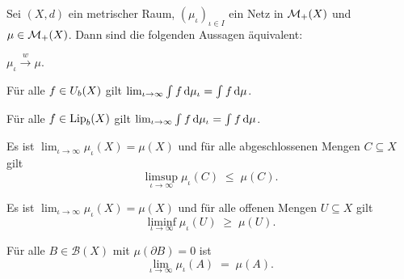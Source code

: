 \documentclass[../main/main.tex]{subfiles}
\begin{document}
	\begin{Satz}[Portmanteau]
		\label{thm:portmanteau}
		Sei $(X, d)$ ein metrischer Raum, $(\mu_\iota)_{\iota \in I}$ ein Netz in $\mathcal{M}_{+}(X)$
		und $\mu \in \mathcal{M}_{+}(X)$. Dann sind die folgenden Aussagen äquivalent:
		\begin{equivalentthm}
			\item $\mu_\iota \xrightarrow{w} \mu$.
			\item Für alle $f \in U_b(X)$ gilt $\lim_{\iota \to \infty} \int_{} \, f \, \mathrm{d}\mu_\iota = \int_{} \, f \, \mathrm{d}\mu$.
			\item Für alle $f \in \mathrm{Lip}_b(X)$ gilt $\lim_{\iota \to \infty} \int_{} \, f \, \mathrm{d}\mu_\iota = \int_{} \, f \, \mathrm{d}\mu$.
			\item Es ist 
			$\lim_{\iota \to \infty} \mu_\iota(X) = \mu(X)$
			und für alle abgeschlossenen Mengen $C \subseteq X$ gilt 
			$$\limsup_{\iota \to \infty} \mu_\iota(C) \; \leq \; \mu(C) \text{.}$$
			\item Es ist 
			$\lim_{\iota \to \infty} \mu_\iota(X) = \mu(X)$
			und für alle offenen Mengen $U \subseteq X$ gilt 
			$$\liminf_{\iota \to \infty} \mu_\iota(U) \; \geq \; \mu(U) \text{.}$$
			\item Für alle $B \in \mathcal{B}(X)$ mit $\mu(\partial B) = 0$ 
			ist $$\lim_{\iota \to \infty} \mu_\iota(A) \; = \; \mu(A) \text{.}$$
		\end{equivalentthm}
	\end{Satz}
	
\end{document}
